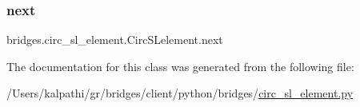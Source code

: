 \subsubsection{\texorpdfstring{next}{next}}
{\footnotesize\ttfamily bridges.\+circ\+\_\+sl\+\_\+element.\+Circ\+S\+Lelement.\+next}



The documentation for this class was generated from the following file\+:\begin{DoxyCompactItemize}
\item 
/\+Users/kalpathi/gr/bridges/client/python/bridges/\mbox{\hyperlink{circ__sl__element_8py}{circ\+\_\+sl\+\_\+element.\+py}}\end{DoxyCompactItemize}
